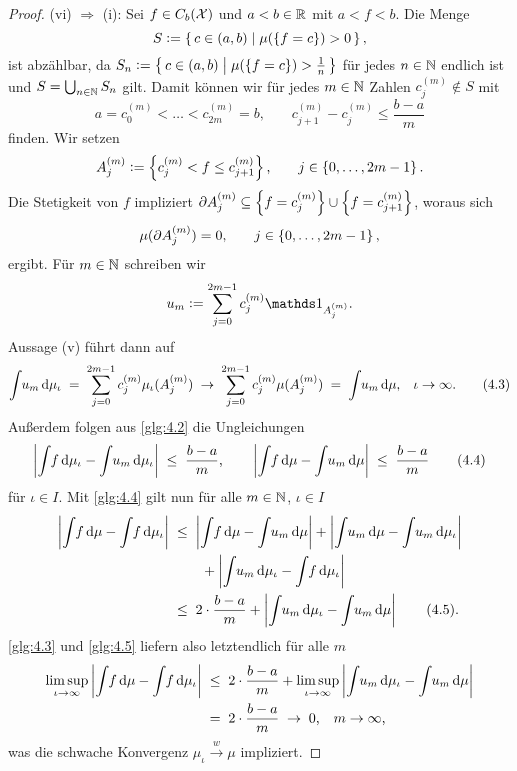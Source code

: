\documentclass[../thesis/thesis.tex]{subfiles}
\begin{document}
\begin{proof}
		(vi) $\Rightarrow$ (i): Sei $f \in C_b(\mathcal{X})$ und $a < b \in \mathbb{R}$ 
		mit $a < f < b$. Die Menge
		$$S \vcentcolon = \left\{\, c \in (a, b) \; \middle| \; \mu(\left\{f = c\right\}) > 0 \,\right\} \text{,}$$
		ist abzählbar, da 
		$S_n \vcentcolon = \left\{\, c \in (a, b) \; \middle| \; \mu(\left\{f = c\right\}) > \frac{1}{n} \,\right\}$ 
		für jedes $n \in \mathbb{N}$ endlich ist und $S = \bigcup_{n \in \mathbb{N}} S_n$ gilt.
		Damit können wir für jedes $m \in \mathbb{N}$ Zahlen $c_j^{(m)} \notin S$ mit
		\[a = c_0^{(m)} < \dots < c_{2m}^{(m)} = 
		b \text{,} \qquad c_{j+1}^{(m)} - c_j^{(m)} \leq \frac{b-a}{m} 
		\label{glg:4.2} \tag{4.2}\]
		finden. Wir setzen
		$$A_j^{(m)} \vcentcolon = \left\{c_j^{(m)} < f \leq c_{j+1}^{(m)}\right\}\text{,}
		\qquad j \in \left\{0,\dots,2m-1\right\} \text{.}$$ 
		Die Stetigkeit von $f$ impliziert 
		$\partial A_j^{(m)} \subseteq \left\{f = c_j^{(m)}\right\} \cup \left\{f = c_{j+1}^{(m)}\right\}$, 
		woraus sich 
		$$\mu(\partial A_j^{(m)}) = 0 \text{,} \qquad j \in \left\{0,\dots,2m-1\right\} \text{,}$$
		ergibt. Für $m \in \mathbb{N}$ schreiben wir
		$$u_m \defby \sum_{j=0}^{2m-1} c_j^{(m)} \indfct_{A_j^{(m)}} \text{.}$$
		Aussage (v) führt dann auf
		\[\int_{} \, u_m \, \mathrm{d}\mu_\iota \; = \; \sum_{j=0}^{2m-1} c_j^{(m)} \mu_\iota(A_j^{(m)}) 
		\; \to \; \sum_{j=0}^{2m-1} c_j^{(m)} \mu(A_j^{(m)}) \; = \; 
		\int_{} \, u_m \, \mathrm{d}\mu \text{,} \quad \iota \to \infty \text{.} 
		\label{glg:4.3} \tag{4.3}\]
		Außerdem folgen aus \eqref{glg:4.2} die Ungleichungen
		\[\left| \int_{} \, f \, \mathrm{d}\mu_\iota - \int_{} \, u_m \, \mathrm{d}\mu_\iota \right| \; \leq \; 
		\frac{b-a}{m} \text{,} \qquad 
		\left| \int_{} \, f \, \mathrm{d}\mu - \int_{} \, u_m \, \mathrm{d}\mu \right| \; \leq \; 
		\frac{b-a}{m} \label{glg:4.4} \tag{4.4}\]
		für $\iota \in I$.
		Mit \eqref{glg:4.4} gilt nun für alle $m \in \mathbb{N}$, $\iota \in I$
		\begin{align*}
			\left| \int_{} \, f \, \mathrm{d}\mu - \int_{} \, f \, \mathrm{d}\mu_\iota \right| \; &\leq \; 
			\left| \int_{} \, f \, \mathrm{d}\mu - \int_{} \, u_m \, \mathrm{d}\mu \right| + 
			\left| \int_{} \, u_m \, \mathrm{d}\mu - \int_{} \, u_m \, \mathrm{d}\mu_\iota \right| \\ & \qquad + 
			\left| \int_{} \, u_m \, \mathrm{d}\mu_\iota - \int_{} \, f \, \mathrm{d}\mu_\iota \right| \\
			&\leq \; 2 \cdot \frac{b-a}{m} + \left| \int_{} \, u_m \, \mathrm{d}\mu_\iota - 
			\int_{} \, u_m \, \mathrm{d}\mu \right| \label{glg:4.5} \tag{4.5}\text{.}
		\end{align*}
		\eqref{glg:4.3} und \eqref{glg:4.5} liefern also letztendlich für alle $m$
		\begin{align*}
			\limsup_{\iota \to \infty} \left| \int_{} \, f \, \mathrm{d}\mu - 
			\int_{} \, f \, \mathrm{d}\mu_\iota \right|
			\; &\leq \; 2 \cdot \frac{b-a}{m} + 
			\limsup_{\iota \to \infty} \left| \int_{} \, u_m \, \mathrm{d}\mu_\iota - 
			\int_{} \, u_m \, \mathrm{d}\mu \right| \\
			&= \; 2 \cdot \frac{b-a}{m} \; \to \; 0 \text{,} 
			\quad m \to \infty \text{,}
		\end{align*}
		was die schwache Konvergenz $\mu_\iota \xrightarrow{w} \mu$ impliziert.
	\end{proof}
\end{document}
